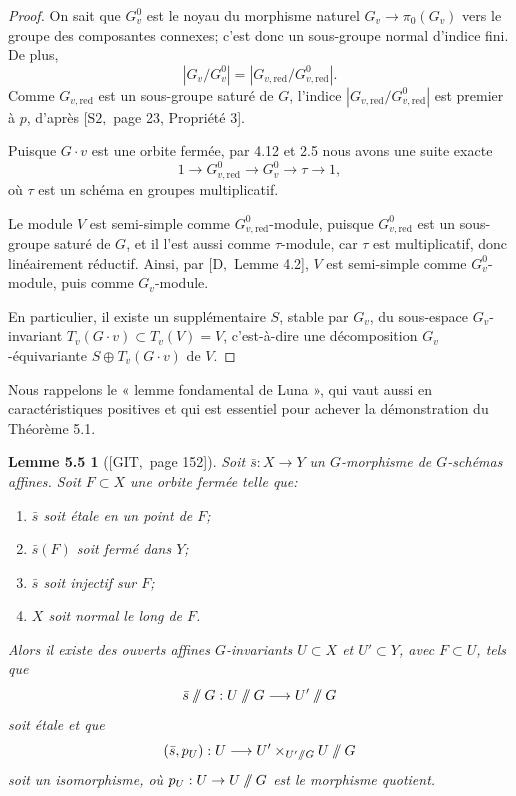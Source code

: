 \documentclass[11pt]{article}
\newcommand{\red}{\mathrm{red}}
\providecommand{\sslash}{\mathbin{/\mkern-6mu/}}
\newtheorem*{lemme55}{Lemme 5.5}
\begin{document}
\begin{proof}
On sait que \(G_v^0\) est le noyau du morphisme naturel \(G_v\to\pi_0(G_v)\) vers le
groupe des composantes connexes; c'est donc un sous-groupe normal d'indice fini. De plus,
\[
  |G_v/G_v^0|=|G_{v,\red}/G_{v,\red}^0|.
\]
Comme \(G_{v,\red}\) est un sous-groupe saturé de \(G\), l'indice
\(|G_{v,\red}/G_{v,\red}^0|\) est premier à \(p\), d'après \([\mathrm{S2},\) page 23,
Propriété 3].

Puisque \(G\cdot v\) est une orbite fermée, par 4.12 et 2.5 nous avons une suite exacte
\begin{equation}
  1\longrightarrow G_{v,\red}^0\longrightarrow G_v^0\longrightarrow \tau\longrightarrow 1,
  \tag{5.4.1}
\end{equation}
où \(\tau\) est un schéma en groupes multiplicatif.

Le module \(V\) est semi-simple comme \(G_{v,\red}^0\)-module, puisque
\(G_{v,\red}^0\) est un sous-groupe saturé de \(G\), et il l'est aussi comme
\(\tau\)-module, car \(\tau\) est multiplicatif, donc linéairement réductif. Ainsi, par
\([\mathrm D,\) Lemme 4.2], \(V\) est semi-simple comme \(G_v^0\)-module, puis comme
\(G_v\)-module.

En particulier, il existe un supplémentaire \(S\), stable par \(G_v\), du sous-espace
\(G_v\)-invariant \(T_v(G\cdot v)\subset T_v(V)=V\), c'est-à-dire une décomposition
\(G_v\)-équivariante \(S\oplus T_v(G\cdot v)\) de \(V\).
\end{proof}

Nous rappelons le « lemme fondamental de Luna », qui vaut aussi en caractéristiques
positives et qui est essentiel pour achever la démonstration du Théorème 5.1.

\begin{lemme55}[{\([\mathrm{GIT},\) page 152]}]
Soit \(\bar s:X\to Y\) un \(G\)-morphisme de \(G\)-schémas affines. Soit \(F\subset X\)
une orbite fermée telle que:
\begin{enumerate}[label=(\arabic*)]
\item \(\bar s\) soit étale en un point de \(F\);
\item \(\bar s(F)\) soit fermé dans \(Y\);
\item \(\bar s\) soit injectif sur \(F\);
\item \(X\) soit normal le long de \(F\).
\end{enumerate}
Alors il existe des ouverts affines \(G\)-invariants \(U\subset X\) et \(U'\subset Y\),
avec \(F\subset U\), tels que
\[
  \bar s\sslash G:U\sslash G\longrightarrow U'\sslash G
\]
soit étale et que
\[
  (\bar s,p_U):U\longrightarrow U'\times_{U'\sslash G}U\sslash G
\]
soit un isomorphisme, où \(p_U:U\to U\sslash G\) est le morphisme quotient.
\end{lemme55}
\end{document}
